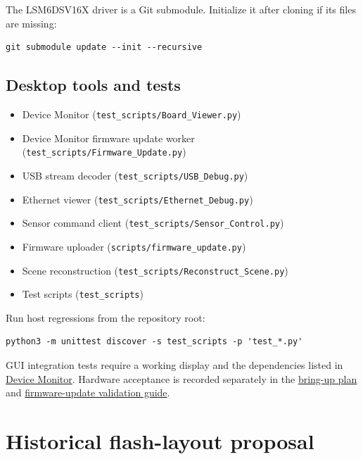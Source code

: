 \documentclass[10pt,a4paper,oneside]{report}
\providecommand{\tightlist}{\setlength{\itemsep}{1pt}\setlength{\parskip}{1pt}}
\begin{document}
The LSM6DSV16X driver is a Git submodule. Initialize it after cloning if its files are missing:

\begin{verbatim}
git submodule update --init --recursive
\end{verbatim}

\section{Desktop tools and tests}\label{wiki-reference-dependencies--desktop-tools-and-tests}

\begin{itemize}
\tightlist
\item
  {Device Monitor (\nolinkurl{test_scripts/Board_Viewer.py})}
\item
  {Device Monitor firmware update worker (\nolinkurl{test_scripts/Firmware_Update.py})}
\item
  {USB stream decoder (\nolinkurl{test_scripts/USB_Debug.py})}
\item
  {Ethernet viewer (\nolinkurl{test_scripts/Ethernet_Debug.py})}
\item
  {Sensor command client (\nolinkurl{test_scripts/Sensor_Control.py})}
\item
  {Firmware uploader (\nolinkurl{scripts/firmware_update.py})}
\item
  {Scene reconstruction (\nolinkurl{test_scripts/Reconstruct_Scene.py})}
\item
  {Test scripts (\nolinkurl{test_scripts})}
\end{itemize}

Run host regressions from the repository root:

\begin{verbatim}
python3 -m unittest discover -s test_scripts -p 'test_*.py'
\end{verbatim}

GUI integration tests require a working display and the dependencies listed in \hyperref[wiki-tools-device-monitor--installation]{Device Monitor}. Hardware acceptance is recorded separately in the \hyperref[wiki-hardware-bring-up-and-testing--magnecko-sense-mgs--bring-up--system-test-protocol]{bring-up plan} and \hyperref[wiki-firmware-firmware-updates--validation]{firmware-update validation guide}.

\chapter{Historical flash-layout proposal}\label{wiki-reference-flash-layout-proposal--stm32n6--s28hs512t-external-flash-memory-map}
\end{document}
